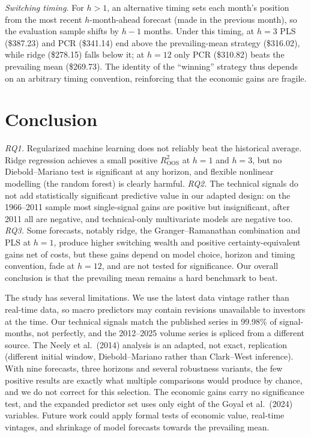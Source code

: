 \documentclass[11pt,a4paper]{article}
\begin{document}


\emph{Switching timing.} For $h>1$, an alternative timing sets each month's
position from the most recent $h$-month-ahead forecast (made in the
previous month), so the evaluation sample shifts by $h-1$ months. Under this
timing, at $h=3$ PLS (\$387.23) and PCR (\$341.14) end above the
prevailing-mean strategy (\$316.02), while ridge (\$278.15) falls below it;
at $h=12$ only PCR (\$310.82) beats the prevailing mean (\$269.73). The
identity of the ``winning'' strategy thus depends on an arbitrary timing
convention, reinforcing that the economic gains are fragile.



\section{Conclusion}\label{sec:conclusion}
\emph{RQ1.} Regularized machine learning does not reliably beat the
historical average. Ridge regression achieves a small positive
$R^2_{\mathrm{OOS}}$ at $h=1$ and $h=3$, but no Diebold--Mariano test is
significant at any horizon, and flexible nonlinear modelling (the random
forest) is clearly harmful. \emph{RQ2.} The technical signals do not add
statistically significant predictive value in our adapted design: on the
1966--2011 sample most single-signal gains are positive but insignificant,
after 2011 all are negative, and technical-only multivariate models are
negative too. \emph{RQ3.} Some forecasts, notably ridge, the
Granger--Ramanathan combination and PLS at $h=1$, produce higher switching
wealth and positive certainty-equivalent gains net of costs, but these
gains depend on model choice, horizon and timing convention, fade at
$h=12$, and are not tested for significance. Our overall conclusion is that
the prevailing mean remains a hard benchmark to beat.

The study has several limitations. We use the latest data vintage rather
than real-time data, so macro predictors may contain revisions unavailable
to investors at the time. Our technical signals match the published series
in 99.98\% of signal-months, not perfectly, and the 2012--2025 volume
series is spliced from a different source. The Neely et al.\ (2014)
analysis is an adapted, not exact, replication (different initial window,
Diebold--Mariano rather than Clark--West inference). With nine forecasts,
three horizons and several robustness variants, the few positive results
are exactly what multiple comparisons would produce by chance, and we do
not correct for this selection. The economic gains carry no significance
test, and the expanded predictor set uses only eight of the Goyal et al.\
(2024) variables. Future work could apply formal tests of economic value,
real-time vintages, and shrinkage of model forecasts towards the prevailing
mean.
\end{document}
